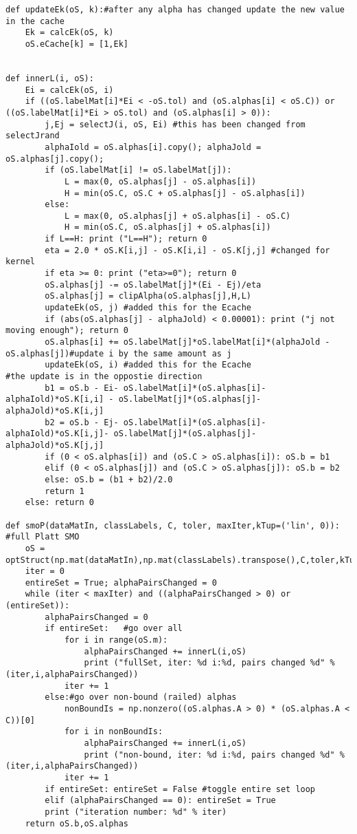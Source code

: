 \begin{lstlisting}
def updateEk(oS, k):#after any alpha has changed update the new value in the cache
    Ek = calcEk(oS, k)
    oS.eCache[k] = [1,Ek]
	

def innerL(i, oS):
    Ei = calcEk(oS, i)
    if ((oS.labelMat[i]*Ei < -oS.tol) and (oS.alphas[i] < oS.C)) or ((oS.labelMat[i]*Ei > oS.tol) and (oS.alphas[i] > 0)):
        j,Ej = selectJ(i, oS, Ei) #this has been changed from selectJrand
        alphaIold = oS.alphas[i].copy(); alphaJold = oS.alphas[j].copy();
        if (oS.labelMat[i] != oS.labelMat[j]):
            L = max(0, oS.alphas[j] - oS.alphas[i])
            H = min(oS.C, oS.C + oS.alphas[j] - oS.alphas[i])
        else:
            L = max(0, oS.alphas[j] + oS.alphas[i] - oS.C)
            H = min(oS.C, oS.alphas[j] + oS.alphas[i])
        if L==H: print ("L==H"); return 0
        eta = 2.0 * oS.K[i,j] - oS.K[i,i] - oS.K[j,j] #changed for kernel
        if eta >= 0: print ("eta>=0"); return 0
        oS.alphas[j] -= oS.labelMat[j]*(Ei - Ej)/eta
        oS.alphas[j] = clipAlpha(oS.alphas[j],H,L)
        updateEk(oS, j) #added this for the Ecache
        if (abs(oS.alphas[j] - alphaJold) < 0.00001): print ("j not moving enough"); return 0
        oS.alphas[i] += oS.labelMat[j]*oS.labelMat[i]*(alphaJold - oS.alphas[j])#update i by the same amount as j
        updateEk(oS, i) #added this for the Ecache                    #the update is in the oppostie direction
        b1 = oS.b - Ei- oS.labelMat[i]*(oS.alphas[i]-alphaIold)*oS.K[i,i] - oS.labelMat[j]*(oS.alphas[j]-alphaJold)*oS.K[i,j]
        b2 = oS.b - Ej- oS.labelMat[i]*(oS.alphas[i]-alphaIold)*oS.K[i,j]- oS.labelMat[j]*(oS.alphas[j]-alphaJold)*oS.K[j,j]
        if (0 < oS.alphas[i]) and (oS.C > oS.alphas[i]): oS.b = b1
        elif (0 < oS.alphas[j]) and (oS.C > oS.alphas[j]): oS.b = b2
        else: oS.b = (b1 + b2)/2.0
        return 1
    else: return 0

def smoP(dataMatIn, classLabels, C, toler, maxIter,kTup=('lin', 0)):    #full Platt SMO
    oS = optStruct(np.mat(dataMatIn),np.mat(classLabels).transpose(),C,toler,kTup)
    iter = 0
    entireSet = True; alphaPairsChanged = 0
    while (iter < maxIter) and ((alphaPairsChanged > 0) or (entireSet)):
        alphaPairsChanged = 0
        if entireSet:   #go over all
            for i in range(oS.m):
                alphaPairsChanged += innerL(i,oS)
                print ("fullSet, iter: %d i:%d, pairs changed %d" % (iter,i,alphaPairsChanged))
            iter += 1
        else:#go over non-bound (railed) alphas
            nonBoundIs = np.nonzero((oS.alphas.A > 0) * (oS.alphas.A < C))[0]
            for i in nonBoundIs:
                alphaPairsChanged += innerL(i,oS)
                print ("non-bound, iter: %d i:%d, pairs changed %d" % (iter,i,alphaPairsChanged))
            iter += 1
        if entireSet: entireSet = False #toggle entire set loop
        elif (alphaPairsChanged == 0): entireSet = True
        print ("iteration number: %d" % iter)
    return oS.b,oS.alphas


\end{lstlisting}
